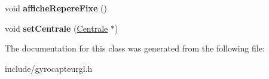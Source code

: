 \begin{DoxyCompactItemize}
\item 
\hypertarget{class_gyro_capteur_g_l_a543fa917222d7e9460d654213ff0f920}{void {\bfseries affiche\-Repere\-Fixe} ()}\label{class_gyro_capteur_g_l_a543fa917222d7e9460d654213ff0f920}

\item 
\hypertarget{class_gyro_capteur_g_l_ad43bcaeddd7f61a6775d83f9cbb7e574}{void {\bfseries set\-Centrale} (\hyperlink{class_centrale}{Centrale} $\ast$)}\label{class_gyro_capteur_g_l_ad43bcaeddd7f61a6775d83f9cbb7e574}

\end{DoxyCompactItemize}


The documentation for this class was generated from the following file\-:\begin{DoxyCompactItemize}
\item 
include/gyrocapteurgl.\-h\end{DoxyCompactItemize}
